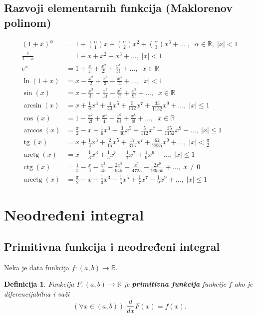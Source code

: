 \documentclass[a4paper,12pt,twoside]{report}
\newtheorem{definition}{Definicija}[section]
\numberwithin{algorithm}{section}
\DeclareMathOperator{\arccot}{arccot}
\renewcommand{\tan}{\operatorname{tg}}
\renewcommand{\cot}{\operatorname{ctg}}
\renewcommand{\arctan}{\operatorname{arctg}}
\renewcommand{\arccot}{\operatorname{arcctg}}
\begin{document}
\subsection{Razvoji elementarnih funkcija (Maklorenov polinom)}
\[
\begin{aligned}
    (1+x)^\alpha &= 1+{{\alpha}\choose{1}}x+{{\alpha}\choose{2}}x^2 +{{\alpha}\choose{3}}x^3+\dots\;,\;\;\alpha \in \mathbb{R}, \;|x| < 1\\
    \frac{1}{1-x} &= 1+x+x^2+x^3+\dots, \;|x| < 1\\
    e^x&=1+\frac{x}{1!}+\frac{x^2}{2!}+\frac{x^3}{3!}+\dots,\;\;x \in \mathbb{R}\\
    \ln(1+x)&=x-\frac{x^2}{2}+\frac{x^3}{3}-\frac{x^4}{4}+\dots, \;|x| < 1\\
    \sin(x)&=x-\frac{x^3}{3!}+\frac{x^5}{5!}-\frac{x^7}{7!}+\frac{x^9}{9!}+\dots,\;\;x \in \mathbb{R}\\
    \arcsin(x)&=x+\frac{1}{6}x^3+\frac{3}{40}x^5+\frac{5}{112}x^7+\frac{35}{1152}x^9+\dots, \;|x| \leq 1 \\
    \cos(x)&=1-\frac{x^2}{2!}+\frac{x^4}{4!}-\frac{x^6}{6!}+\frac{x^8}{8!}+\dots,\;\;x \in \mathbb{R}\\
    \arccos(x)&=\frac{\pi}{2}-x-\frac{1}{6}x^3-\frac{3}{40}x^5-\frac{5}{112}x^7-\frac{35}{1152}x^9-\dots, \;|x| \leq 1\\
    \tan(x)&=x+\frac{1}{3}x^3+\frac{2}{15}x^5+\frac{17}{315}x^7+\frac{62}{2835}x^9+\dots, \;|x| < \frac{\pi}{2}\\
    \arctan(x) &= x-\frac{1}{3}x^3+\frac{1}{5}x^5-\frac{1}{7}x^7+\frac{1}{9}x^9+\dots, \;|x| \leq 1\\
    \cot(x)&= \frac{1}{x}-\frac{x}{3}-\frac{x^3}{45}-\frac{2x^5}{945}+\frac{x^7}{4725}-\frac{2x^9}{93555}+\dots, \; x \neq 0\\
    \arccot(x) &= \frac{\pi}{2}-x+\frac{1}{3}x^3-\frac{1}{5}x^5+\frac{1}{7}x^7-\frac{1}{9}x^9+\dots, \;|x| \leq 1
\end{aligned}
\]
\newpage
\section{Neodređeni integral}
\subsection{Primitivna funkcija i neodređeni integral}
Neka je data funkcija $f:(a, b) \to \mathbb{R}$.
\begin{definition}
    Funkcija $F:(a, b) \to \mathbb{R}$ je \textbf{primitivna funkcija} funkcije $f$ ako je diferencijabilna i važi
    \[ (\forall x \in (a, b)) \; \frac{d}{dx}F(x) = f(x). \]
\end{definition}
\end{document}
